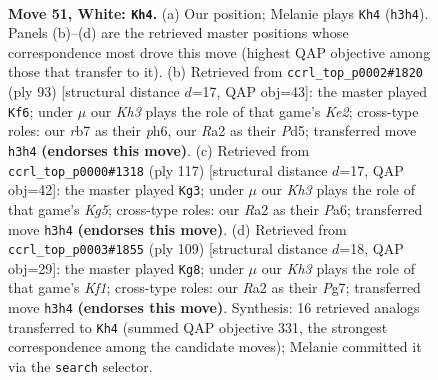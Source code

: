 \documentclass[11pt]{article}
\begin{document}
\clearpage

\begin{figure}[p]\centering
\begin{subfigure}{0.46\textwidth}\centering
\resizebox{\linewidth}{!}{%
\newchessgame
\chessboard[
  setfen={6k1/1r4b1/8/6R1/2P5/4N2K/R7/8 w - - 22 51},
  showmover=false,
  pgfstyle=straightmove, color=movearrow, markmove={h3-h4}
]}
\caption{}
\end{subfigure}\hfill
\begin{subfigure}{0.46\textwidth}\centering
\resizebox{\linewidth}{!}{%
\newchessgame
\chessboard[
  setfen={8/4k3/7P/3p4/7K/7B/8/7r b - - 0 47},
  showmover=false,
  pgfstyle=straightmove, color=movearrow, markmove={e7-f6}
]}
\caption{}
\end{subfigure}
\\[4pt]
\begin{subfigure}{0.46\textwidth}\centering
\resizebox{\linewidth}{!}{%
\newchessgame
\chessboard[
  setfen={8/8/p3N3/8/6k1/r1BK4/8/8 b - - 1 59},
  showmover=false,
  pgfstyle=straightmove, color=movearrow, markmove={g4-g3}
]}
\caption{}
\end{subfigure}\hfill
\begin{subfigure}{0.46\textwidth}\centering
\resizebox{\linewidth}{!}{%
\newchessgame
\chessboard[
  setfen={5k2/2R3p1/8/4K3/4B3/8/8/4r3 b - - 14 55},
  showmover=false,
  pgfstyle=straightmove, color=movearrow, markmove={f8-g8}
]}
\caption{}
\end{subfigure}
\caption{\textbf{Move 51, White: \texttt{Kh4}.} (a) Our position; Melanie plays \texttt{Kh4} (\texttt{h3h4}). Panels (b)--(d) are the retrieved master positions whose correspondence most drove this move (highest QAP objective among those that transfer to it). (b) Retrieved from \texttt{ccrl\_top\_p0002\#1820} (ply 93) [structural distance $d$=17, QAP obj=43]: the master played \texttt{Kf6}; under $\mu$ our \emph{Kh3} plays the role of that game's \emph{Ke2}; cross-type roles: our \emph{r}b7 as their \emph{p}h6, our \emph{R}a2 as their \emph{P}d5; transferred move \texttt{h3h4} \textbf{(endorses this move)}. (c) Retrieved from \texttt{ccrl\_top\_p0000\#1318} (ply 117) [structural distance $d$=17, QAP obj=42]: the master played \texttt{Kg3}; under $\mu$ our \emph{Kh3} plays the role of that game's \emph{Kg5}; cross-type roles: our \emph{R}a2 as their \emph{P}a6; transferred move \texttt{h3h4} \textbf{(endorses this move)}. (d) Retrieved from \texttt{ccrl\_top\_p0003\#1855} (ply 109) [structural distance $d$=18, QAP obj=29]: the master played \texttt{Kg8}; under $\mu$ our \emph{Kh3} plays the role of that game's \emph{Kf1}; cross-type roles: our \emph{R}a2 as their \emph{P}g7; transferred move \texttt{h3h4} \textbf{(endorses this move)}. Synthesis: 16 retrieved analogs transferred to \texttt{Kh4} (summed QAP objective 331, the strongest correspondence among the candidate moves); Melanie committed it via the \texttt{search} selector.}
\label{fig:thought-m100}
\end{figure}
\end{document}
